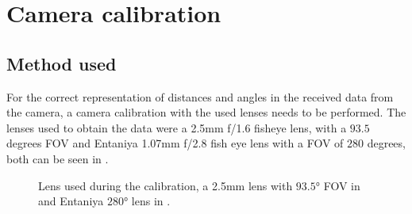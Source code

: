 
\chapter{Camera calibration\label{chap:calib}}

\section{Method used}

For the correct representation of distances and angles in the received data from the camera, a camera calibration with the used lenses needs to be performed.
The lenses used to obtain the data were a 2.5mm f/1.6 fisheye lens, with a $93.5$ degrees \ac{FOV} and Entaniya 1.07mm f/2.8 fish eye lens with a FOV 
of $280$ degrees, both can be seen in .

\begin{figure}[H]
	\centering
	\caption{
		Lens used during the calibration, a 2.5mm lens with $93.5°$ FOV in  and Entaniya $280°$ lens in .
  }
	\label{fig:lenses}
\end{figure}


